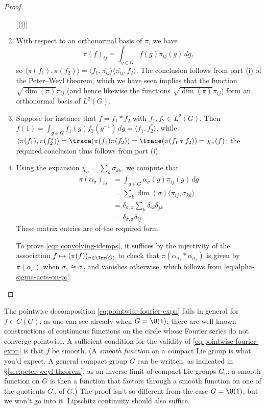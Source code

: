 \documentclass[reqno]{amsart} 
\begin{document}
\begin{proof}
  \begin{enumerate}
[(i)]
  \item With respect to an orthonormal basis of $\pi$, we have
    \begin{equation*}
      \pi(f)_{i j}
      = \int_{g \in G}
      f(g) \pi_{i j}(g) \, d g,
    \end{equation*}
    so $\langle \pi(f_1), \pi(f_2) \rangle = \langle f_1, \overline{\pi_{i j}} \rangle \langle \overline{\pi_{i j}}, f_2 \rangle$.  The conclusion follows from part (i) of the Peter--Weyl theorem, which we have seen implies that the function $\sqrt{\dim(\pi)} \pi_{i j}$ (and hence likewise the functions $\sqrt{\dim(\pi)} \overline{\pi_{i j}}$) form an orthonormal basis of $L^2(G)$.
  \item Suppose for instance that $f = f_1 \ast f_2$ with $f_1, f_2 \in L^2(G)$.  Then $f(1) = \int_{g \in G} f_1(g) f_2(g^{-1}) \, d g = \langle f_1, f_2^* \rangle$, while $\langle \pi(f_1), \pi(f_2^*) \rangle = \trace(\pi(f_1) \pi(f_2)) = \trace(\pi(f_1 \ast f_2)) = \chi_\pi(f)$; the required conclusion thus follows from part (i).
  \item Using the expansion $\chi_\sigma = \sum_{k } \sigma_{k k}$, we compute that
    \begin{align*}
      \pi(\alpha_\sigma)_{i j}
      &=
        \int_{g \in G}
        \alpha_\sigma(g) \pi_{i j}(g) \, d g
      \\
      &=
        \sum_k
        \dim(\sigma)
        \langle \pi_{i j}, \sigma_{k k} \rangle
      \\
      &= \delta_{\sigma,\pi}
        \sum_k
        \delta_{i k}
        \delta_{j k}
      \\
      &= \delta_{\sigma,\pi}
        \delta_{i j}.
    \end{align*}
    These matrix entries are of the required form.

    To prove \eqref{eqn:convolving-idemps}, it suffices by the injectivity of the association $f \mapsto (\pi(f))_{\pi \in \Irr(G)}$ to check that $\pi(\alpha_{\sigma_1} \ast \alpha_{\sigma_2})$ is given by $\pi(\alpha_\sigma)$ when $\sigma_1 \cong \sigma_2$ and vanishes otherwise, which follows from \eqref{eq:alpha-sigma-acts-on-pi}.
  \end{enumerate}
\end{proof}

The pointwise decomposition \eqref{eq:pointwise-fourier-expn} fails in general for $f \in C(G)$, as one can see already when $G = \U(1)$; there are well-known constructions of continuous functions on the circle whose Fourier series do not converge pointwise.  A sufficient condition for the validity of \eqref{eq:pointwise-fourier-expn} is that $f$ be smooth.  (A \emph{smooth function} on a compact Lie group is what you'd expect.  A general compact group $G$ can be written, as indicated in \S\ref{sec:peter-weyl-theorem}, as an inverse limit of compact Lie groups $G_n$; a smooth function on $G$ is then a function that factors through a smooth function on one of the quotients $G_n$ of $G$.)  The proof isn't so different from the case $G = \U(1)$, but we won't go into it.  Lipschitz continuity should also suffice.
\end{document}
